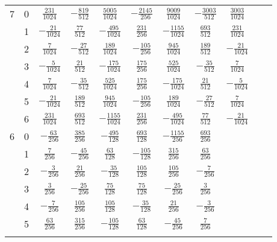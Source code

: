 \begin{table}
\begin{center}
\begin{tabular}{ccccccccccc}
      7  &  0  &  $ \frac{ 231}{ 1024}$  &  $-\frac{ 819}{ 512}$  &  $ \frac{ 5005}{1024}$  &  $-\frac{ 2145}{ 256}$  &  $ \frac{  9009}{ 1024}$  &  $-\frac{  3003}{ 512}$  &  $ \frac{  3003}{1024}$  \\ \addlinespace
         &  1  &  $-\frac{  21}{ 1024}$  &  $ \frac{  77}{ 512}$  &  $-\frac{  495}{1024}$  &  $ \frac{  231}{ 256}$  &  $-\frac{  1155}{ 1024}$  &  $ \frac{   693}{ 512}$  &  $ \frac{   231}{1024}$  \\ \addlinespace
         &  2  &  $ \frac{   7}{ 1024}$  &  $-\frac{  27}{ 512}$  &  $ \frac{  189}{1024}$  &  $-\frac{  105}{ 256}$  &  $ \frac{   945}{ 1024}$  &  $ \frac{   189}{ 512}$  &  $-\frac{    21}{1024}$  \\ \addlinespace
         &  3  &  $-\frac{   5}{ 1024}$  &  $ \frac{  21}{ 512}$  &  $-\frac{  175}{1024}$  &  $ \frac{  175}{ 256}$  &  $ \frac{   525}{ 1024}$  &  $-\frac{    35}{ 512}$  &  $ \frac{     7}{1024}$  \\ \addlinespace
         &  4  &  $ \frac{   7}{ 1024}$  &  $-\frac{  35}{ 512}$  &  $ \frac{  525}{1024}$  &  $ \frac{  175}{ 256}$  &  $-\frac{   175}{ 1024}$  &  $ \frac{    21}{ 512}$  &  $-\frac{     5}{1024}$  \\ \addlinespace
         &  5  &  $-\frac{  21}{ 1024}$  &  $ \frac{ 189}{ 512}$  &  $ \frac{  945}{1024}$  &  $-\frac{  105}{ 256}$  &  $ \frac{   189}{ 1024}$  &  $-\frac{    27}{ 512}$  &  $ \frac{     7}{1024}$  \\ \addlinespace
         &  6  &  $ \frac{ 231}{ 1024}$  &  $ \frac{ 693}{ 512}$  &  $-\frac{ 1155}{1024}$  &  $ \frac{  231}{ 256}$  &  $-\frac{   495}{ 1024}$  &  $ \frac{    77}{ 512}$  &  $-\frac{    21}{1024}$  \\ \addlinespace

      6  &  0  &  $-\frac{  63}{  256}$  &  $ \frac{ 385}{ 256}$  &  $-\frac{  495}{ 128}$  &  $ \frac{  693}{ 128}$  &  $-\frac{  1155}{  256}$  &  $ \frac{   693}{ 256}$  \\ \addlinespace
         &  1  &  $ \frac{   7}{  256}$  &  $-\frac{  45}{ 256}$  &  $ \frac{   63}{ 128}$  &  $-\frac{  105}{ 128}$  &  $ \frac{   315}{  256}$  &  $ \frac{    63}{ 256}$  \\ \addlinespace
         &  2  &  $-\frac{   3}{  256}$  &  $ \frac{  21}{ 256}$  &  $-\frac{   35}{ 128}$  &  $ \frac{  105}{ 128}$  &  $ \frac{   105}{  256}$  &  $-\frac{     7}{ 256}$  \\ \addlinespace
         &  3  &  $ \frac{   3}{  256}$  &  $-\frac{  25}{ 256}$  &  $ \frac{   75}{ 128}$  &  $ \frac{   75}{ 128}$  &  $-\frac{    25}{  256}$  &  $ \frac{     3}{ 256}$  \\ \addlinespace
         &  4  &  $-\frac{   7}{  256}$  &  $ \frac{ 105}{ 256}$  &  $ \frac{  105}{ 128}$  &  $-\frac{   35}{ 128}$  &  $ \frac{    21}{  256}$  &  $-\frac{     3}{ 256}$  \\ \addlinespace
         &  5  &  $ \frac{  63}{  256}$  &  $ \frac{ 315}{ 256}$  &  $-\frac{  105}{ 128}$  &  $ \frac{   63}{ 128}$  &  $-\frac{    45}{  256}$  &  $ \frac{     7}{ 256}$  \\ \addlinespace


\end{tabular}
\end{center}
\end{table}
